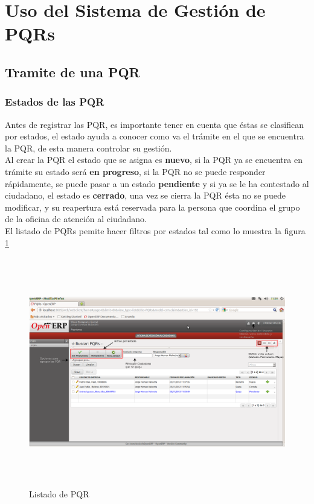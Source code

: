 %
%
\section{Uso del Sistema de Gestión de PQRs}
\subsection {Tramite de una PQR}

\subsubsection{Estados de las PQR}

Antes de registrar las PQR, es importante tener en cuenta que éstas se clasifican por estados, 
el estado ayuda a conocer como va el trámite en el que se encuentra la PQR, de esta manera controlar su gestión.\\

Al crear la PQR el estado que se asigna es \textbf{nuevo}, si la PQR ya se encuentra en trámite
su estado será \textbf{en progreso}, si la PQR no se puede responder rápidamente, se puede pasar a un estado \textbf{pendiente} y si ya se le ha contestado al ciudadano, 
el estado es \textbf{cerrado}, una vez se cierra la PQR ésta no se puede modificar, y su reapertura está reservada para la persona que coordina el 
grupo de la oficina de atención al ciudadano.\\

El listado de PQRs pemite hacer filtros por estados tal como lo muestra la figura \ref{fig:menulista}

\begin{figure}[H]
 \centering
 \includegraphics[width=17cm,height=10cm]{./Imagenes/menulista.png}
 \caption{Listado de PQR}
 \label{fig:menulista}
\end{figure}


